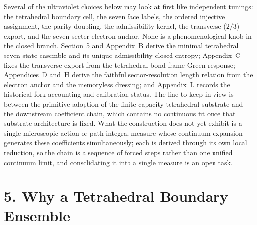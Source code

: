 \documentclass[11pt]{article}
\begin{document}
Several of the ultraviolet choices below may look at first like independent tunings: the tetrahedral boundary cell, the seven face labels, the ordered injective assignment, the parity doubling, the admissibility kernel, the transverse ($2/3$) export, and the seven-sector electron anchor. None is a phenomenological knob in the closed branch. Section~5 and Appendix~B derive the minimal tetrahedral seven-state ensemble and its unique admissibility-closed entropy; Appendix~C fixes the transverse export from the tetrahedral bond-frame Green response; Appendices~D and~H derive the faithful sector-resolution length relation from the electron anchor and the memoryless dressing; and Appendix~L records the historical fork accounting and calibration status. The line to keep in view is between the primitive adoption of the finite-capacity tetrahedral substrate and the downstream coefficient chain, which contains no continuous fit once that substrate architecture is fixed. What the construction does not yet exhibit is a single microscopic action or path-integral measure whose continuum expansion generates these coefficients simultaneously; each is derived through its own local reduction, so the chain is a sequence of forced steps rather than one unified continuum limit, and consolidating it into a single measure is an open task.

\section{5. Why a Tetrahedral Boundary Ensemble}
\end{document}
